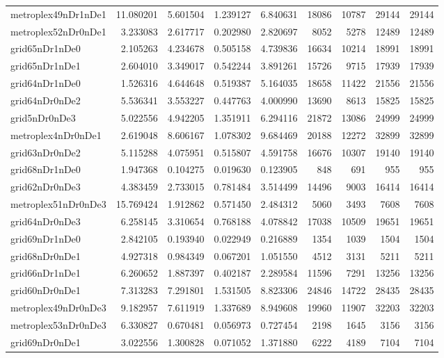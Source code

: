 \begin{longtable}{|l|r|r|r|r|r|r|r|r|}
metroplex49nDr1nDe1 & 11.080201 & 5.601504 & 1.239127 & 6.840631 & 18086 & 10787 & 29144 & 29144 \\
metroplex52nDr0nDe1 & 3.233083 & 2.617717 & 0.202980 & 2.820697 & 8052 & 5278 & 12489 & 12489 \\
grid65nDr1nDe0 & 2.105263 & 4.234678 & 0.505158 & 4.739836 & 16634 & 10214 & 18991 & 18991 \\
grid65nDr1nDe1 & 2.604010 & 3.349017 & 0.542244 & 3.891261 & 15726 & 9715 & 17939 & 17939 \\
grid64nDr1nDe0 & 1.526316 & 4.644648 & 0.519387 & 5.164035 & 18658 & 11422 & 21556 & 21556 \\
grid64nDr0nDe2 & 5.536341 & 3.553227 & 0.447763 & 4.000990 & 13690 & 8613 & 15825 & 15825 \\
grid5nDr0nDe3 & 5.022556 & 4.942205 & 1.351911 & 6.294116 & 21872 & 13086 & 24999 & 24999 \\
metroplex4nDr0nDe1 & 2.619048 & 8.606167 & 1.078302 & 9.684469 & 20188 & 12272 & 32899 & 32899 \\
grid63nDr0nDe2 & 5.115288 & 4.075951 & 0.515807 & 4.591758 & 16676 & 10307 & 19140 & 19140 \\
grid68nDr1nDe0 & 1.947368 & 0.104275 & 0.019630 & 0.123905 & 848 & 691 & 955 & 955 \\
grid62nDr0nDe3 & 4.383459 & 2.733015 & 0.781484 & 3.514499 & 14496 & 9003 & 16414 & 16414 \\
metroplex51nDr0nDe3 & 15.769424 & 1.912862 & 0.571450 & 2.484312 & 5060 & 3493 & 7608 & 7608 \\
grid64nDr0nDe3 & 6.258145 & 3.310654 & 0.768188 & 4.078842 & 17038 & 10509 & 19651 & 19651 \\
grid69nDr1nDe0 & 2.842105 & 0.193940 & 0.022949 & 0.216889 & 1354 & 1039 & 1504 & 1504 \\
grid68nDr0nDe1 & 4.927318 & 0.984349 & 0.067201 & 1.051550 & 4512 & 3131 & 5211 & 5211 \\
grid66nDr1nDe1 & 6.260652 & 1.887397 & 0.402187 & 2.289584 & 11596 & 7291 & 13256 & 13256 \\
grid60nDr0nDe1 & 7.313283 & 7.291801 & 1.531505 & 8.823306 & 24846 & 14722 & 28435 & 28435 \\
metroplex49nDr0nDe3 & 9.182957 & 7.611919 & 1.337689 & 8.949608 & 19960 & 11907 & 32203 & 32203 \\
metroplex53nDr0nDe3 & 6.330827 & 0.670481 & 0.056973 & 0.727454 & 2198 & 1645 & 3156 & 3156 \\
grid69nDr0nDe1 & 3.022556 & 1.300828 & 0.071052 & 1.371880 & 6222 & 4189 & 7104 & 7104 \\

\end{longtable}

